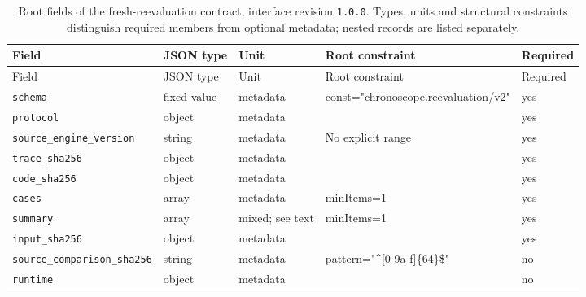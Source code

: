 \begingroup\small
\begin{longtable}{@{}p{}p{}p{}p{}p{}@{}}
\caption{Root fields of the fresh-reevaluation contract, interface revision \texttt{1.0.0}. Types, units and structural constraints distinguish required members from optional metadata; nested records are listed separately.}\label{tab:contract-fresh-reevaluation}\\
\toprule Field & JSON type & Unit & Root constraint & Required\\\midrule\endfirsthead
\toprule Field & JSON type & Unit & Root constraint & Required\\\midrule\endhead
\texttt{schema} & fixed value & metadata & const="chronosco\allowbreak{}pe.reevaluation/\allowbreak{}v2" & yes\\
\texttt{protocol} & object & metadata &  & yes\\
\texttt{source\_\allowbreak{}engine\_\allowbreak{}version} & string & metadata & No explicit range & yes\\
\texttt{trace\_\allowbreak{}sha256} & object & metadata &  & yes\\
\texttt{code\_\allowbreak{}sha256} & object & metadata &  & yes\\
\texttt{cases} & array & metadata & minItems=1 & yes\\
\texttt{summary} & array & mixed; see text & minItems=1 & yes\\
\texttt{input\_\allowbreak{}sha256} & object & metadata &  & yes\\
\texttt{source\_\allowbreak{}comparison\_\allowbreak{}sha256} & string & metadata & pattern="\textasciicircum{}[0-9a-f]\{64\}\$" & no\\
\texttt{runtime} & object & metadata &  & no\\
\bottomrule
\end{longtable}
\endgroup
